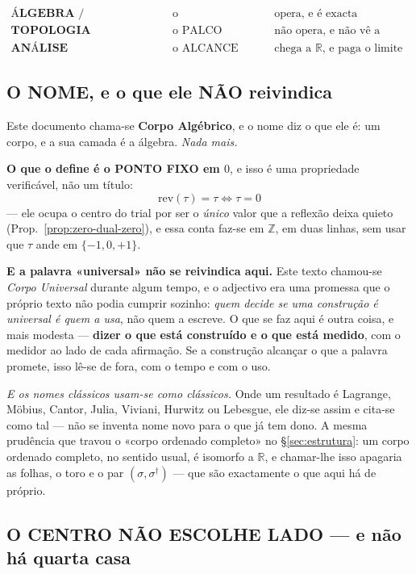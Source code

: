 \documentclass[11pt,a4paper]{article}
\newcommand{\dg}{^{\dagger}}
\begin{document}
\[
\boxed{
\begin{array}{lll}
\textbf{ÁLGEBRA / ARITMÉTICA} & \text{o FUNDAMENTO} & \text{opera, e é exacta}\\[2pt]
\textbf{TOPOLOGIA} & \text{o PALCO} & \text{não opera, e não vê a medida}\\[2pt]
\textbf{ANÁLISE} & \text{o ALCANCE} & \text{chega a }\mathbb{R}\text{, e paga o limite}
\end{array}}
\]

\subsection*{O NOME, e o que ele NÃO reivindica}

Este documento chama-se \textbf{Corpo Algébrico}, e o nome diz o que ele é: um corpo, e a
sua camada é a álgebra. \emph{Nada mais.}

\textbf{O que o define é o PONTO FIXO em $0$}, e isso é uma propriedade verificável, não um
título:
\[
\boxed{\;\mathrm{rev}(\tau)=\tau\iff\tau=0\;}
\]
--- ele ocupa o centro do trial por ser o \emph{único} valor que a reflexão deixa quieto
(Prop.~\ref{prop:zero-dual-zero}), e essa conta faz-se em $\mathbb{Z}$, em duas linhas, sem
usar que $\tau$ ande em $\{-1,0,+1\}$.

\medskip
\noindent\textbf{E a palavra «universal» não se reivindica aqui.} Este texto chamou-se
\emph{Corpo Universal} durante algum tempo, e o adjectivo era uma promessa que o próprio
texto não podia cumprir sozinho: \emph{quem decide se uma construção é universal é quem a
usa}, não quem a escreve. O que se faz aqui é outra coisa, e mais modesta --- \textbf{dizer
o que está construído e o que está medido}, com o medidor ao lado de cada afirmação. Se a
construção alcançar o que a palavra promete, isso lê-se de fora, com o tempo e com o uso.

\emph{E os nomes clássicos usam-se como clássicos.} Onde um resultado é Lagrange, Möbius,
Cantor, Julia, Viviani, Hurwitz ou Lebesgue, ele diz-se assim e cita-se como tal --- não se
inventa nome novo para o que já tem dono. A mesma prudência que travou o «corpo ordenado
completo» no \S\ref{sec:estrutura}: um corpo ordenado completo, no sentido usual, é
isomorfo a $\mathbb{R}$, e chamar-lhe isso apagaria as folhas, o toro e o par
$(\sigma,\sigma\dg)$ --- que são exactamente o que aqui há de próprio.

\subsection*{O CENTRO NÃO ESCOLHE LADO --- e não há quarta casa}
\end{document}
